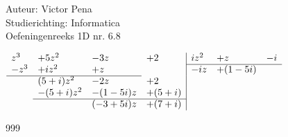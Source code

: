 \documentclass[a4paper]{article}
\begin{document}
	
	
\noindent \large Auteur: Victor Pena \\
\noindent \large Studierichting: Informatica\\
\noindent \large Oefeningenreeks 1D nr. 6.8\\
	
\medskip
	
\normalsize
$
\begin{array}{llll|lll}
	z^3  &+ 5z^2    &- 3z      &+ 2     & iz^2 &+ z      & -i \\ \cline{5-7} 
	-z^3 &+ iz^2    &+ z       &        & -iz  &+ (1-5i) &    \\ \cline{1-3} 
	     &(5+i)z^2  &- 2z      &+ 2     &      &         &    \\ 
	     &-(5+i)z^2 &- (1-5i)z &+ (5+i) &      &         &    \\ \cline{2-4}
	     &          & (-3+5i)z &+ (7+i) &      &         &    \\
\end{array}
$	

\begin{thebibliography}{999}
\end{thebibliography}
\end{document}

